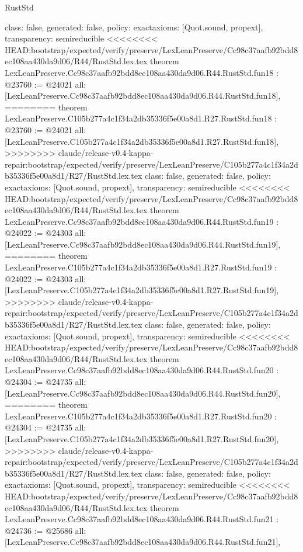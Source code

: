 \begin{lexlean}{RustStd}
\begin{coremodule}
{\begin{coremodule}
{{{{{{{{{{{{{{{{{{{{{  class: false,
  generated: false,
  policy: exact{axioms: [Quot.sound, propext]},
  transparency: semireducible
}
<<<<<<<< HEAD:bootstrap/expected/verify/preserve/LexLeanPreserve/Cc98c37aafb92bdd8ec108aa430da9d06/R44/RustStd.lex.tex
theorem LexLeanPreserve.Cc98c37aafb92bdd8ec108aa430da9d06.R44.RustStd.fun18 : @23760 := @24021 {
  all: [LexLeanPreserve.Cc98c37aafb92bdd8ec108aa430da9d06.R44.RustStd.fun18],
========
theorem LexLeanPreserve.C105b277a4c1f34a2db35336f5e00a8d1.R27.RustStd.fun18 : @23760 := @24021 {
  all: [LexLeanPreserve.C105b277a4c1f34a2db35336f5e00a8d1.R27.RustStd.fun18],
>>>>>>>> claude/release-v0.4-kappa-repair:bootstrap/expected/verify/preserve/LexLeanPreserve/C105b277a4c1f34a2db35336f5e00a8d1/R27/RustStd.lex.tex
  class: false,
  generated: false,
  policy: exact{axioms: [Quot.sound, propext]},
  transparency: semireducible
}
<<<<<<<< HEAD:bootstrap/expected/verify/preserve/LexLeanPreserve/Cc98c37aafb92bdd8ec108aa430da9d06/R44/RustStd.lex.tex
theorem LexLeanPreserve.Cc98c37aafb92bdd8ec108aa430da9d06.R44.RustStd.fun19 : @24022 := @24303 {
  all: [LexLeanPreserve.Cc98c37aafb92bdd8ec108aa430da9d06.R44.RustStd.fun19],
========
theorem LexLeanPreserve.C105b277a4c1f34a2db35336f5e00a8d1.R27.RustStd.fun19 : @24022 := @24303 {
  all: [LexLeanPreserve.C105b277a4c1f34a2db35336f5e00a8d1.R27.RustStd.fun19],
>>>>>>>> claude/release-v0.4-kappa-repair:bootstrap/expected/verify/preserve/LexLeanPreserve/C105b277a4c1f34a2db35336f5e00a8d1/R27/RustStd.lex.tex
  class: false,
  generated: false,
  policy: exact{axioms: [Quot.sound, propext]},
  transparency: semireducible
}
<<<<<<<< HEAD:bootstrap/expected/verify/preserve/LexLeanPreserve/Cc98c37aafb92bdd8ec108aa430da9d06/R44/RustStd.lex.tex
theorem LexLeanPreserve.Cc98c37aafb92bdd8ec108aa430da9d06.R44.RustStd.fun20 : @24304 := @24735 {
  all: [LexLeanPreserve.Cc98c37aafb92bdd8ec108aa430da9d06.R44.RustStd.fun20],
========
theorem LexLeanPreserve.C105b277a4c1f34a2db35336f5e00a8d1.R27.RustStd.fun20 : @24304 := @24735 {
  all: [LexLeanPreserve.C105b277a4c1f34a2db35336f5e00a8d1.R27.RustStd.fun20],
>>>>>>>> claude/release-v0.4-kappa-repair:bootstrap/expected/verify/preserve/LexLeanPreserve/C105b277a4c1f34a2db35336f5e00a8d1/R27/RustStd.lex.tex
  class: false,
  generated: false,
  policy: exact{axioms: [Quot.sound, propext]},
  transparency: semireducible
}
<<<<<<<< HEAD:bootstrap/expected/verify/preserve/LexLeanPreserve/Cc98c37aafb92bdd8ec108aa430da9d06/R44/RustStd.lex.tex
theorem LexLeanPreserve.Cc98c37aafb92bdd8ec108aa430da9d06.R44.RustStd.fun21 : @24736 := @25686 {
  all: [LexLeanPreserve.Cc98c37aafb92bdd8ec108aa430da9d06.R44.RustStd.fun21],
}}}}}}}}}}}}}}}}}}}}}}}}
\end{coremodule}}
\end{coremodule}
\end{lexlean}
